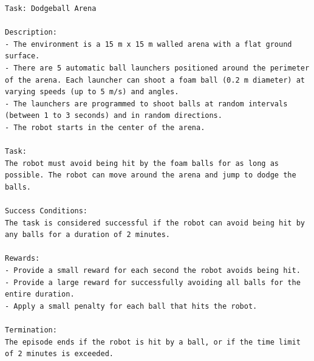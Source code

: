 \begin{lstlisting}[language={}]
Task: Dodgeball Arena

Description:
- The environment is a 15 m x 15 m walled arena with a flat ground surface.
- There are 5 automatic ball launchers positioned around the perimeter of the arena. Each launcher can shoot a foam ball (0.2 m diameter) at varying speeds (up to 5 m/s) and angles.
- The launchers are programmed to shoot balls at random intervals (between 1 to 3 seconds) and in random directions.
- The robot starts in the center of the arena.

Task:
The robot must avoid being hit by the foam balls for as long as possible. The robot can move around the arena and jump to dodge the balls.

Success Conditions:
The task is considered successful if the robot can avoid being hit by any balls for a duration of 2 minutes.

Rewards:
- Provide a small reward for each second the robot avoids being hit.
- Provide a large reward for successfully avoiding all balls for the entire duration.
- Apply a small penalty for each ball that hits the robot.

Termination:
The episode ends if the robot is hit by a ball, or if the time limit of 2 minutes is exceeded.
\end{lstlisting}
